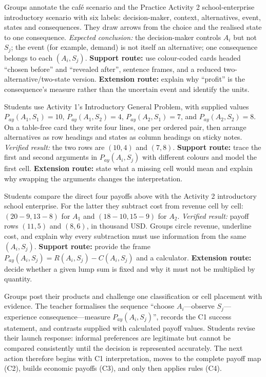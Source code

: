 \documentclass[10pt,letterpaper]{article}
\newcommand{\partheading}[1]{\Needspace{7\baselineskip}\par\vspace{4pt}{\bfseries #1\par}}
\begin{document}
\partheading{Station 1---Who controls what?}
Groups annotate the caf\'e scenario and the Practice Activity 2 school-enterprise
introductory scenario with six labels: decision-maker, context, alternatives,
event, states and consequences. They draw arrows from the choice and the
realised state to one consequence. \textit{Expected conclusion:} the
decision-maker controls $A_i$ but not $S_j$; the event (for example, demand) is
not itself an alternative; one consequence belongs to each $(A_i,S_j)$.
\textbf{Support route:} use colour-coded cards headed ``chosen before'' and
``revealed after'', sentence frames, and a reduced two-alternative/two-state
version. \textbf{Extension route:} explain why ``profit'' is the consequence's
measure rather than the uncertain event and identify the units.

\partheading{Station 2---From narrative to payoff map}
Students use Activity 1's Introductory General Problem, with supplied values
$P_{ay}(A_1,S_1)=10$, $P_{ay}(A_1,S_2)=4$,
$P_{ay}(A_2,S_1)=7$, and $P_{ay}(A_2,S_2)=8$. On a table-free card they write
four lines, one per ordered pair, then arrange alternatives as row headings and
states as column headings on sticky notes. \textit{Verified result:} the two
rows are $(10,4)$ and $(7,8)$. \textbf{Support route:} trace the first and
second arguments in $P_{ay}(A_i,S_j)$ with different colours and model the
first cell. \textbf{Extension route:} state what a missing cell would mean and
explain why swapping the arguments changes the interpretation.

\partheading{Station 3---Is the number supplied or built?}
Students compare the direct four payoffs above with the Activity 2 introductory
school enterprise. For the latter they subtract cost from revenue cell by cell:
$(20-9,13-8)$ for $A_1$ and $(18-10,15-9)$ for $A_2$.
\textit{Verified result:} payoff rows $(11,5)$ and $(8,6)$, in thousand USD.
Groups circle revenue, underline cost, and explain why every subtraction must
use information from the same $(A_i,S_j)$. \textbf{Support route:} provide the
frame $P_{ay}(A_i,S_j)=R(A_i,S_j)-C(A_i,S_j)$ and a calculator. \textbf{Extension
route:} decide whether a given lump sum is fixed and why it must not be
multiplied by quantity.

\partheading{Whole-class synthesis and transition}
Groups post their products and challenge one classification or cell placement
with evidence. The teacher formalises the sequence ``choose $A_i$---observe
$S_j$---experience consequence---measure $P_{ay}(A_i,S_j)$'', records the C1
success statement, and contrasts supplied with calculated payoff values.
Students revise their launch response: informal preferences are legitimate but
cannot be compared consistently until the decision is represented accurately.
The next action therefore begins with C1 interpretation, moves to the complete
payoff map (C2), builds economic payoffs (C3), and only then applies rules (C4).
\end{document}
